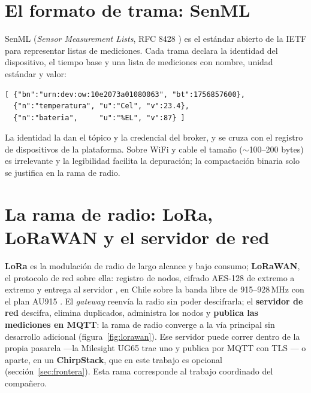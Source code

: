

\section{El formato de trama: SenML}

SenML (\emph{Sensor Measurement Lists}, RFC 8428 \parencite{rfc8428}) es el estándar abierto de la
IETF para representar listas de mediciones. Cada trama declara la identidad del dispositivo, el tiempo
base y una lista de mediciones con nombre, unidad estándar y valor:

\begin{center}
\begin{minipage}{0.92\textwidth}
{\footnotesize
\begin{verbatim}
[ {"bn":"urn:dev:ow:10e2073a01080063", "bt":1756857600},
  {"n":"temperatura", "u":"Cel", "v":23.4},
  {"n":"bateria",     "u":"%EL", "v":87} ]
\end{verbatim}
}
\end{minipage}
\end{center}

La identidad la dan el tópico y la credencial del broker, y se cruza con el registro de dispositivos de la
plataforma. Sobre WiFi y cable el tamaño ($\sim$100--200 bytes) es irrelevante y la legibilidad
facilita la depuración; la compactación binaria solo se justifica en la rama de radio.

\section{La rama de radio: LoRa, LoRaWAN y el servidor de red}
\label{sec:rama-radio}

\textbf{LoRa} es la modulación de radio de largo alcance y bajo consumo; \textbf{LoRaWAN}, el protocolo
de red sobre ella: registro de nodos, cifrado AES-128 de extremo a extremo y entrega al servidor
\parencite{ts001}, en Chile sobre la banda libre de 915--928\,MHz \parencite{lorachile} con el plan AU915
\parencite{rp002}. El
\emph{gateway} reenvía la radio sin poder descifrarla; el \textbf{servidor de red} descifra, elimina
duplicados, administra los nodos y \textbf{publica las mediciones en MQTT}: la rama de radio converge a
la vía principal sin desarrollo adicional (figura~\ref{fig:lorawan}). Ese servidor puede correr dentro
de la propia pasarela —la Milesight UG65 trae uno y publica por MQTT con TLS \parencite{milesightug65}—
o aparte, en un \textbf{ChirpStack}, que en este trabajo es opcional (sección~\ref{sec:frontera}).
Esta rama corresponde al trabajo coordinado del compañero.

